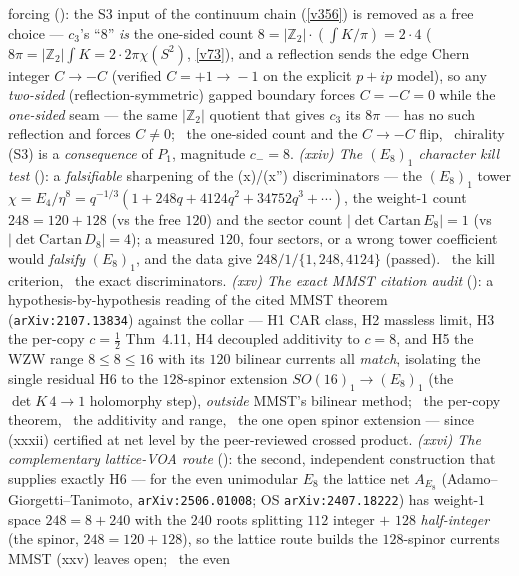 \documentclass[11pt,a4paper]{article}
\newcommand{\Z}{\mathbb Z}
\begin{document}
\begin{keybox}
{forcing} (): the S3 input of the continuum chain (\vref{v356}) is removed as
a free choice --- $c_3$'s ``$8$'' \emph{is} the one-sided count $8{=}|\Z_2|\cdot(\!\int\!K/\pi){=}2\cdot4$
($8\pi{=}|\Z_2|\!\int\!K{=}2\cdot2\pi\chi(S^2)$, \vref{v73}), and a reflection sends the edge Chern integer
$C{\to}{-}C$ (verified $C{=}{+}1\!\to\!{-}1$ on the explicit $p{+}ip$ model), so any \emph{two-sided}
(reflection-symmetric) gapped boundary forces $C{=}{-}C{=}0$ while the \emph{one-sided} seam --- the same $|\Z_2|$
quotient that gives $c_3$ its $8\pi$ --- has no such reflection and forces $C{\neq}0$; \mE\ the one-sided count and
the $C{\to}{-}C$ flip, \mC\ chirality (S3) is a \emph{consequence} of $P_1$, magnitude $c_-{=}8$. \emph{(xxiv) The
$(E_8)_1$ character kill test} (): a \emph{falsifiable} sharpening of the
(x)/(x'') discriminators --- the $(E_8)_1$ tower $\chi{=}E_4/\eta^8{=}q^{-1/3}(1{+}248q{+}4124q^2{+}34752q^3{+}\cdots)$,
the weight-$1$ count $248{=}120{+}128$ (vs the free $120$) and the sector count $|\!\det\mathrm{Cartan}\,E_8|{=}1$
(vs $|\!\det\mathrm{Cartan}\,D_8|{=}4$); a measured $120$, four sectors, or a wrong tower coefficient would
\emph{falsify} $(E_8)_1$, and the data give $248/1/\{1,248,4124\}$ (passed). \mX\ the kill criterion, \mE\ the exact
discriminators. \emph{(xxv) The exact MMST citation audit} (): a
hypothesis-by-hypothesis reading of the cited MMST theorem (\texttt{arXiv:2107.13834}) against the collar --- H1 CAR
class, H2 massless limit, H3 the per-copy $c{=}\tfrac12$ Thm~4.11, H4 decoupled additivity to $c{=}8$, and H5 the WZW
range $8{\le}8{\le}16$ with its $120$ bilinear currents all \emph{match}, isolating the single residual H6 to the
$128$-spinor extension $SO(16)_1{\to}(E_8)_1$ (the $\det K\,4{\to}1$ holomorphy step), \emph{outside} MMST's bilinear
method; \mE\ the per-copy theorem, \mC\ the additivity and range, \mO\ the one open spinor extension --- since
(xxxii) certified at net level by the peer-reviewed crossed product. \emph{(xxvi)
The complementary lattice-VOA route} (): the second, independent
construction that supplies exactly H6 --- for the even unimodular $E_8$ the lattice net $A_{E_8}$
(Adamo--Giorgetti--Tanimoto, \texttt{arXiv:2506.01008}; OS \texttt{arXiv:2407.18222}) has weight-$1$ space
$248{=}8{+}240$ with the $240$ roots splitting $112$ integer $+$ $128$ \emph{half-integer} (the spinor,
$248{=}120{+}128$), so the lattice route builds the $128$-spinor currents MMST (xxv) leaves open; \mE\ the even

\end{keybox}
\end{document}
